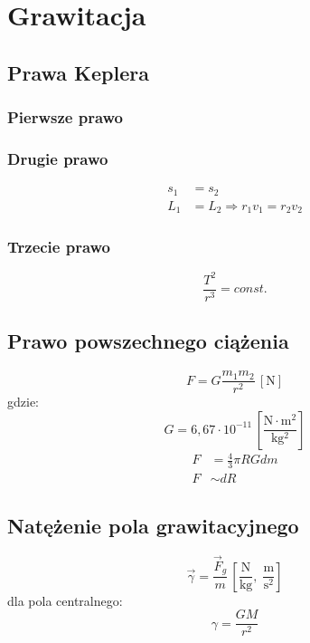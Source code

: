\documentclass{article}
\numberwithin{equation}{section}
\newcommand{\unit}[1]{\, \left[\mathrm{#1}\right]}
\begin{document}
  \newpage
  \section{Grawitacja}
    \subsection{Prawa Keplera}
      \subsubsection{Pierwsze prawo}
      \subsubsection{Drugie prawo}
        \begin{align}
          s_1 &= s_2\\
          L_1 &= L_2 \Rightarrow r_1v_1 = r_2v_2
        \end{align}
      \subsubsection{Trzecie prawo}
        \begin{equation}
          \frac{T^2}{r^3} = const.
        \end{equation}
    \subsection{Prawo powszechnego ciążenia}
      \begin{equation}
        F = G\frac{m_1m_2}{r^2} \unit{N}
      \end{equation}
      gdzie:
      \begin{equation}
        G = 6,67\cdot 10^{-11} \unit{\frac{N\cdot m^2}{kg^2}}
      \end{equation}
      \begin{align}
        F &= \frac{4}{3}\pi RGdm\\
        F &\sim dR
      \end{align}
    \subsection{Natężenie pola grawitacyjnego}
      \begin{equation}
        \vec\gamma = \frac{\vec F_g}{m} \unit{\frac{N}{kg},\;\frac{m}{s^2}}
      \end{equation}
      dla pola centralnego:
      \begin{equation}
        \gamma = \frac{GM}{r^2}
      \end{equation}
\end{document}
